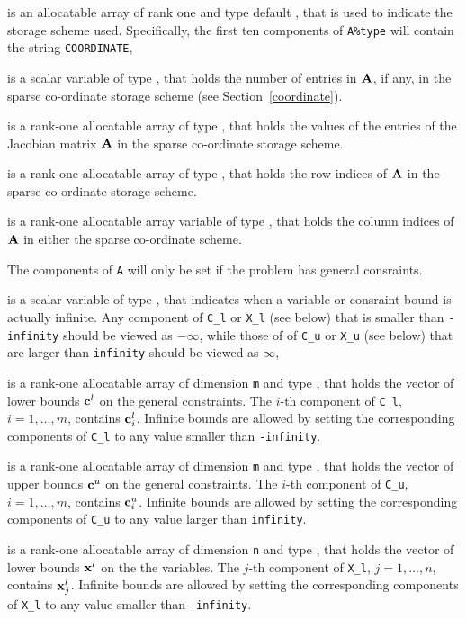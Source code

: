 \documentclass{galahad}
\begin{document}
\begin{description}
\begin{description}

 is an allocatable array of rank one and type default \character,
that is used to indicate the storage scheme used. Specifically,
the first ten components of {\tt A\%type} will contain the
string {\tt COORDINATE},

 is a scalar variable of type \integer, that
holds the number of entries in ${\mathbf{A}}$, if any,
in the sparse co-ordinate storage scheme (see Section~\ref{coordinate}).

 is a rank-one allocatable array of type \realdp, that holds
the values of the entries of the Jacobian matrix ${\mathbf{A}}$
in the sparse co-ordinate storage scheme.

 is a rank-one allocatable array of type \integer,
that holds the row indices of ${\mathbf{A}}$ in the sparse co-ordinate storage scheme.

 is a rank-one allocatable array variable of type \integer,
that holds the column indices of ${\mathbf{A}}$ in either the sparse co-ordinate scheme.
\end{description}

The components of {\tt A} will only be set if the problem has general
consraints.

 is a scalar variable of type \realdp, that indicates
when a variable or consraint bound is actually infinite. Any component
of {\tt C\_l} or {\tt X\_l} (see below) that is smaller than {\tt -infinity}
should be viewed as $- \infty$, while those of
of {\tt C\_u} or {\tt X\_u} (see below) that are larger than {\tt infinity}
should be viewed as $\infty$,

 is a rank-one allocatable array of dimension {\tt m} and type
\realdp, that holds the vector of lower bounds ${\mathbf{c}}^{l}$
on the general constraints. The $i$-th component of
{\tt C\_l}, $i = 1, \ldots , m$, contains ${\mathbf{c}}_{i}^{l}$.
Infinite bounds are allowed by setting the corresponding
components of {\tt C\_l} to any value smaller than {\tt -infinity}.

 is a rank-one allocatable array of dimension {\tt m} and type
\realdp, that holds the vector of upper bounds ${\mathbf{c}}^{u}$
on the general constraints. The $i$-th component of
{\tt C\_u}, $i = 1,  \ldots ,  m$, contains ${\mathbf{c}}_{i}^{u}$.
Infinite bounds are allowed by setting the corresponding
components of {\tt C\_u} to any value larger than {\tt infinity}.

 is a rank-one allocatable array of dimension {\tt n} and type
\realdp, that holds
the vector of lower bounds ${\mathbf{x}}^{l}$ on the the variables.
The $j$-th component of {\tt X\_l}, $j = 1, \ldots , n$,
contains ${\mathbf{x}}_{j}^{l}$.
Infinite bounds are allowed by setting the corresponding
components of {\tt X\_l} to any value smaller than {\tt -infinity}.


\end{description}
\end{document}
